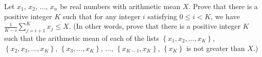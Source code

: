 Let $x_1$,  $x_2$,  ..., $x_n$ be real numbers with arithmetic mean $X$. Prove that there is a positive integer $K$ such that for any integer $i$ satisfying $0\leq i<K$,  we have $\frac{1}{K-i}\sum_{j=i+1}^{K} x_j \leq X$. (In other words, prove that there is a positive integer $K$ such that the arithmetic mean of each of the lists $\left\{x_1,x_2,...,x_K\right\}$,  $\left\{x_2,x_3,...,x_K\right\}$,  $\left\{x_3,...,x_K\right\}$,  ..., $\left\{x_{K-1},x_K\right\}$,  $\left\{x_K\right\}$ is not greater than $X$.)